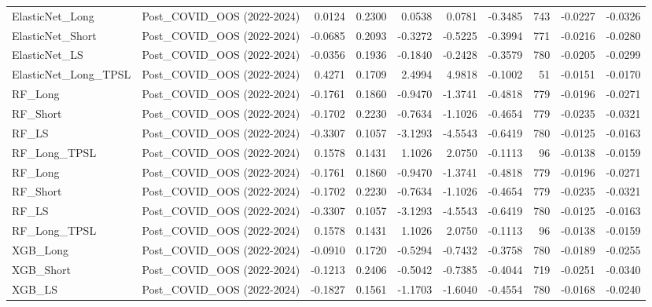 \begin{tabular}{llrrrrrrrr}
\cline{1-10}
ElasticNet\_Long & Post\_COVID\_OOS (2022-2024) & 0.0124 & 0.2300 & 0.0538 & 0.0781 & -0.3485 & 743 & -0.0227 & -0.0326 \\
\cline{1-10}
ElasticNet\_Short & Post\_COVID\_OOS (2022-2024) & -0.0685 & 0.2093 & -0.3272 & -0.5225 & -0.3994 & 771 & -0.0216 & -0.0280 \\
\cline{1-10}
ElasticNet\_LS & Post\_COVID\_OOS (2022-2024) & -0.0356 & 0.1936 & -0.1840 & -0.2428 & -0.3579 & 780 & -0.0205 & -0.0299 \\
\cline{1-10}
ElasticNet\_Long\_TPSL & Post\_COVID\_OOS (2022-2024) & 0.4271 & 0.1709 & 2.4994 & 4.9818 & -0.1002 & 51 & -0.0151 & -0.0170 \\
\cline{1-10}
RF\_Long & Post\_COVID\_OOS (2022-2024) & -0.1761 & 0.1860 & -0.9470 & -1.3741 & -0.4818 & 779 & -0.0196 & -0.0271 \\
\cline{1-10}
RF\_Short & Post\_COVID\_OOS (2022-2024) & -0.1702 & 0.2230 & -0.7634 & -1.1026 & -0.4654 & 779 & -0.0235 & -0.0321 \\
\cline{1-10}
RF\_LS & Post\_COVID\_OOS (2022-2024) & -0.3307 & 0.1057 & -3.1293 & -4.5543 & -0.6419 & 780 & -0.0125 & -0.0163 \\
\cline{1-10}
RF\_Long\_TPSL & Post\_COVID\_OOS (2022-2024) & 0.1578 & 0.1431 & 1.1026 & 2.0750 & -0.1113 & 96 & -0.0138 & -0.0159 \\
\cline{1-10}
RF\_Long & Post\_COVID\_OOS (2022-2024) & -0.1761 & 0.1860 & -0.9470 & -1.3741 & -0.4818 & 779 & -0.0196 & -0.0271 \\
\cline{1-10}
RF\_Short & Post\_COVID\_OOS (2022-2024) & -0.1702 & 0.2230 & -0.7634 & -1.1026 & -0.4654 & 779 & -0.0235 & -0.0321 \\
\cline{1-10}
RF\_LS & Post\_COVID\_OOS (2022-2024) & -0.3307 & 0.1057 & -3.1293 & -4.5543 & -0.6419 & 780 & -0.0125 & -0.0163 \\
\cline{1-10}
RF\_Long\_TPSL & Post\_COVID\_OOS (2022-2024) & 0.1578 & 0.1431 & 1.1026 & 2.0750 & -0.1113 & 96 & -0.0138 & -0.0159 \\
\cline{1-10}
XGB\_Long & Post\_COVID\_OOS (2022-2024) & -0.0910 & 0.1720 & -0.5294 & -0.7432 & -0.3758 & 780 & -0.0189 & -0.0255 \\
\cline{1-10}
XGB\_Short & Post\_COVID\_OOS (2022-2024) & -0.1213 & 0.2406 & -0.5042 & -0.7385 & -0.4044 & 719 & -0.0251 & -0.0340 \\
\cline{1-10}
XGB\_LS & Post\_COVID\_OOS (2022-2024) & -0.1827 & 0.1561 & -1.1703 & -1.6040 & -0.4554 & 780 & -0.0168 & -0.0240 \\
\cline{1-10}

\end{tabular}
